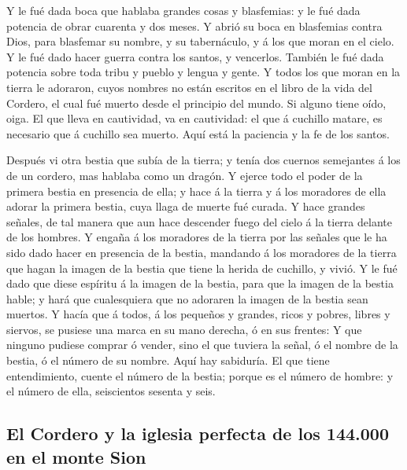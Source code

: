 Y le fué dada boca que hablaba grandes cosas y blasfemias:
y le fué dada potencia de obrar cuarenta y dos meses.  Y
abrió su boca en blasfemias contra Dios, para blasfemar su nombre, y su
tabernáculo, y á los que moran en el cielo.  Y le fué dado
hacer guerra contra los santos, y vencerlos. También le fué dada
potencia sobre toda tribu y pueblo y lengua y gente.  Y
todos los que moran en la tierra le adoraron, cuyos nombres no están
escritos en el libro de la vida del Cordero, el cual fué muerto desde el
principio del mundo.  Si alguno tiene oído, oiga.
 El que lleva en cautividad, va en cautividad: el que á
cuchillo matare, es necesario que á cuchillo sea muerto. Aquí está la
paciencia y la fe de los santos.

 Después vi otra bestia que subía de la tierra; y tenía dos
cuernos semejantes á los de un cordero, mas hablaba como un dragón.
 Y ejerce todo el poder de la primera bestia en presencia
de ella; y hace á la tierra y á los moradores de ella adorar la primera
bestia, cuya llaga de muerte fué curada.  Y hace grandes
señales, de tal manera que aun hace descender fuego del cielo á la
tierra delante de los hombres.  Y engaña á los moradores de
la tierra por las señales que le ha sido dado hacer en presencia de la
bestia, mandando á los moradores de la tierra que hagan la imagen de la
bestia que tiene la herida de cuchillo, y vivió.  Y le fué
dado que diese espíritu á la imagen de la bestia, para que la imagen de
la bestia hable; y hará que cualesquiera que no adoraren la imagen de la
bestia sean muertos.  Y hacía que á todos, á los pequeños y
grandes, ricos y pobres, libres y siervos, se pusiese una marca en su
mano derecha, ó en sus frentes:  Y que ninguno pudiese
comprar ó vender, sino el que tuviera la señal, ó el nombre de la
bestia, ó el número de su nombre.  Aquí hay sabiduría. El
que tiene entendimiento, cuente el número de la bestia; porque es el
número de hombre: y el número de ella, seiscientos sesenta y seis.

\hypertarget{el-cordero-y-la-iglesia-perfecta-de-los-144.000-en-el-monte-sion}{%
\subsection{El Cordero y la iglesia perfecta de los 144.000 en el monte
Sion}\label{el-cordero-y-la-iglesia-perfecta-de-los-144.000-en-el-monte-sion}}

